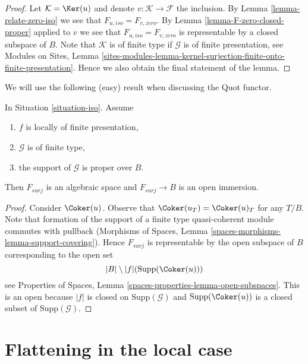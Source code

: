 \begin{proof}
Let $\mathcal{K} = \Ker(u)$ and denote $v : \mathcal{K} \to \mathcal{F}$
the inclusion. By Lemma \ref{lemma-relate-zero-iso} we see that
$F_{u, iso} = F_{v, zero}$. By Lemma \ref{lemma-F-zero-closed-proper}
applied to $v$ we see that $F_{u, iso} = F_{v, zero}$ is representable
by a closed subspace of $B$. Note that $\mathcal{K}$ is of finite type
if $\mathcal{G}$ is of finite presentation, see
Modules on Sites, Lemma
\ref{sites-modules-lemma-kernel-surjection-finite-onto-finite-presentation}.
Hence we also obtain the final statement of the lemma.
\end{proof}

\noindent
We will use the following (easy) result when discussing the Quot functor.

\begin{lemma}
\label{lemma-F-surj-open}
In Situation \ref{situation-iso}. Assume
\begin{enumerate}
\item $f$ is locally of finite presentation,
\item $\mathcal{G}$ is of finite type,
\item the support of $\mathcal{G}$ is proper over $B$.
\end{enumerate}
Then $F_{surj}$ is an algebraic space and $F_{surj} \to B$
is an open immersion.
\end{lemma}

\begin{proof}
Consider $\Coker(u)$. Observe that
$\Coker(u_T) = \Coker(u)_T$ for any $T/B$.
Note that formation of the support of a finite type
quasi-coherent module commutes with pullback
(Morphisms of Spaces, Lemma \ref{spaces-morphisms-lemma-support-covering}).
Hence $F_{surj}$ is representable by the open subspace of $B$
corresponding to the open set
$$
|B| \setminus |f|(\text{Supp}(\Coker(u)))
$$
see Properties of Spaces, Lemma \ref{spaces-properties-lemma-open-subspaces}.
This is an open because $|f|$ is closed on $\text{Supp}(\mathcal{G})$
and $\text{Supp}(\Coker(u))$ is a closed subset of
$\text{Supp}(\mathcal{G})$.
\end{proof}






\section{Flattening in the local case}
\label{section-flattening-local}


